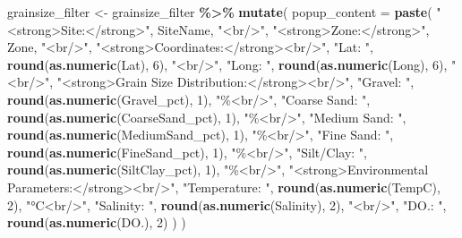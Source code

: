 \documentclass[
]{article}
\newenvironment{Shaded}{\begin{snugshade}}{\end{snugshade}}
\newcommand{\AttributeTok}[1]{\textcolor[rgb]{0.13,0.29,0.53}{#1}}
\newcommand{\DecValTok}[1]{\textcolor[rgb]{0.00,0.00,0.81}{#1}}
\newcommand{\FunctionTok}[1]{\textcolor[rgb]{0.13,0.29,0.53}{\textbf{#1}}}
\newcommand{\NormalTok}[1]{#1}
\newcommand{\OtherTok}[1]{\textcolor[rgb]{0.56,0.35,0.01}{#1}}
\newcommand{\SpecialCharTok}[1]{\textcolor[rgb]{0.81,0.36,0.00}{\textbf{#1}}}
\newcommand{\StringTok}[1]{\textcolor[rgb]{0.31,0.60,0.02}{#1}}
\begin{document}
\begin{Shaded}
\begin{Highlighting}[]
\NormalTok{grainsize\_filter }\OtherTok{\textless{}{-}}\NormalTok{ grainsize\_filter }\SpecialCharTok{\%\textgreater{}\%}
  \FunctionTok{mutate}\NormalTok{(}
    \AttributeTok{popup\_content =} \FunctionTok{paste}\NormalTok{(}
      \StringTok{"\textless{}strong\textgreater{}Site:\textless{}/strong\textgreater{}"}\NormalTok{, SiteName, }\StringTok{"\textless{}br/\textgreater{}"}\NormalTok{,}
      \StringTok{"\textless{}strong\textgreater{}Zone:\textless{}/strong\textgreater{}"}\NormalTok{, Zone, }\StringTok{"\textless{}br/\textgreater{}"}\NormalTok{,}
      \StringTok{"\textless{}strong\textgreater{}Coordinates:\textless{}/strong\textgreater{}\textless{}br/\textgreater{}"}\NormalTok{,}
      \StringTok{"Lat: "}\NormalTok{, }\FunctionTok{round}\NormalTok{(}\FunctionTok{as.numeric}\NormalTok{(Lat), }\DecValTok{6}\NormalTok{), }\StringTok{"\textless{}br/\textgreater{}"}\NormalTok{,}
      \StringTok{"Long: "}\NormalTok{, }\FunctionTok{round}\NormalTok{(}\FunctionTok{as.numeric}\NormalTok{(Long), }\DecValTok{6}\NormalTok{), }\StringTok{"\textless{}br/\textgreater{}"}\NormalTok{,}
      \StringTok{"\textless{}strong\textgreater{}Grain Size Distribution:\textless{}/strong\textgreater{}\textless{}br/\textgreater{}"}\NormalTok{,}
      \StringTok{"Gravel: "}\NormalTok{, }\FunctionTok{round}\NormalTok{(}\FunctionTok{as.numeric}\NormalTok{(Gravel\_pct), }\DecValTok{1}\NormalTok{), }\StringTok{"\%\textless{}br/\textgreater{}"}\NormalTok{,}
      \StringTok{"Coarse Sand: "}\NormalTok{, }\FunctionTok{round}\NormalTok{(}\FunctionTok{as.numeric}\NormalTok{(CoarseSand\_pct), }\DecValTok{1}\NormalTok{), }\StringTok{"\%\textless{}br/\textgreater{}"}\NormalTok{,}
      \StringTok{"Medium Sand: "}\NormalTok{, }\FunctionTok{round}\NormalTok{(}\FunctionTok{as.numeric}\NormalTok{(MediumSand\_pct), }\DecValTok{1}\NormalTok{), }\StringTok{"\%\textless{}br/\textgreater{}"}\NormalTok{,}
      \StringTok{"Fine Sand: "}\NormalTok{, }\FunctionTok{round}\NormalTok{(}\FunctionTok{as.numeric}\NormalTok{(FineSand\_pct), }\DecValTok{1}\NormalTok{), }\StringTok{"\%\textless{}br/\textgreater{}"}\NormalTok{,}
      \StringTok{"Silt/Clay: "}\NormalTok{, }\FunctionTok{round}\NormalTok{(}\FunctionTok{as.numeric}\NormalTok{(SiltClay\_pct), }\DecValTok{1}\NormalTok{), }\StringTok{"\%\textless{}br/\textgreater{}"}\NormalTok{,}
      \StringTok{"\textless{}strong\textgreater{}Environmental Parameters:\textless{}/strong\textgreater{}\textless{}br/\textgreater{}"}\NormalTok{,}
      \StringTok{"Temperature: "}\NormalTok{, }\FunctionTok{round}\NormalTok{(}\FunctionTok{as.numeric}\NormalTok{(TempC), }\DecValTok{2}\NormalTok{), }\StringTok{"°C\textless{}br/\textgreater{}"}\NormalTok{,}
      \StringTok{"Salinity: "}\NormalTok{, }\FunctionTok{round}\NormalTok{(}\FunctionTok{as.numeric}\NormalTok{(Salinity), }\DecValTok{2}\NormalTok{), }\StringTok{"\textless{}br/\textgreater{}"}\NormalTok{,}
      \StringTok{"DO.: "}\NormalTok{, }\FunctionTok{round}\NormalTok{(}\FunctionTok{as.numeric}\NormalTok{(}\StringTok{\textasciigrave{}}\AttributeTok{DO.}\StringTok{\textasciigrave{}}\NormalTok{), }\DecValTok{2}\NormalTok{)}
\NormalTok{    )}
\NormalTok{  )}
\end{Highlighting}
\end{Shaded}
\end{document}
